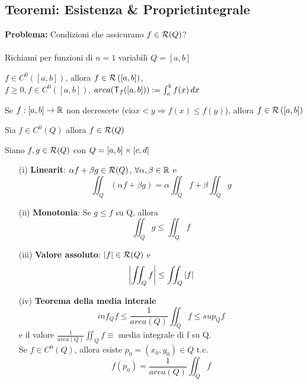 \subsection{Teoremi: Esistenza \& Propriet\aca integrale}
\textbf{Problema:} Condizioni che assicurano $f\in \mathcal{R}(Q)$? \\\\
Richiami per funzioni di $n=1$ variabili $Q=[a,b]$
\begin{theorem}
  $f \in C^0\left([a,b]\right)$, allora $f\in \mathcal{R}\left([a,b]\right)$, \\
  $f \geq 0, f \in C^0\left([a,b]\right)$, $area(\mathsf{T}_f([a,b])) := \int_{a}^{b} f(x)\, dx$
\end{theorem}
\begin{theorem}
  Se $f:[a,b]\to \mathbb{R}$ \ace non decrescete (cio\ace $x<y \Rightarrow f(x)\leq f(y)$), allora $f \in \mathcal{R}\left([a,b]\right)$
\end{theorem}
\begin{theorem}
  Sia $f \in C^0\left(Q\right)$ allora $f \in \mathcal{R}(Q)$
\end{theorem}
\begin{theorem}
  Siano $f,g \in \mathcal{R} (Q)$ con $Q = [a,b]\times[c,d]$
  \begin{itemize}
    \item[(i)] \textbf{Linearit\aca}: $\alpha f + \beta g \in \mathcal{R}(Q)$, $\forall \alpha,\beta\in\mathbb{R}$ e 
              $$\iint_{Q}\left(\alpha f + \beta g\right) = \alpha \iint_{Q}f + \beta \iint_{Q} g$$
    \item[(ii)] \textbf{Monotonia}: Se $g\leq f$ su Q, allora $$\iint_{Q} g \leq \iint_{Q}f$$
    \item[(iii)] \textbf{Valore assoluto}: $\left\lvert f \right\rvert \in \mathcal{R}(Q)$ e $$\left\lvert \iint_{Q}f \right\rvert \leq \iint_{Q}\left\lvert f \right\rvert$$
    \item[(iv)] \textbf{Teorema della media interale} 
                $$inf_{Q} f \leq \frac{1}{area(Q)}\iint_{Q} f \leq sup_{Q}f$$
                e il valore $\frac{1}{area(Q)}\iint_{Q} f \equiv$ media integrale di f su Q. \\
                Se $f \in C^0(Q)$, allora esiste $p_0 = (x_0,y_0)\in Q$ t.c. 
                $$f(p_0) = \frac{1}{area(Q)}\iint_{Q} f$$
  \end{itemize}
\end{theorem}
